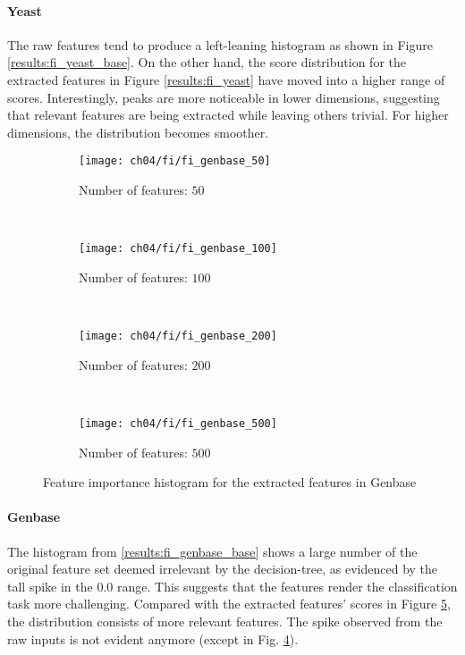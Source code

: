 \paragraph{Yeast} The raw features tend to produce a left-leaning histogram
as shown in Figure \ref{results:fi_yeast_base}.  On the other hand, the score
distribution for the extracted features in Figure \ref{results:fi_yeast} have
moved into a higher range of scores. Interestingly, peaks are more noticeable
in lower dimensions, suggesting that relevant features are being extracted
while leaving others trivial. For higher dimensions, the distribution becomes
smoother. 

\begin{figure}[t]
    \centering
    \begin{subfigure}[b]{0.45\textwidth}
        \texttt{[image: ch04/fi/fi\_genbase\_50]}
        \caption{Number of features: $50$}
        \label{results:fi_genbase_50}
    \end{subfigure}
    ~ %
    \begin{subfigure}[b]{0.45\textwidth}
        \texttt{[image: ch04/fi/fi\_genbase\_100]}
        \caption{Number of features: $100$}
        \label{results:fi_genbase_100}
    \end{subfigure}
    ~ %
    \begin{subfigure}[b]{0.45\textwidth}
        \texttt{[image: ch04/fi/fi\_genbase\_200]}
        \caption{Number of features: $200$}
        \label{results:fi_genbase_200}
    \end{subfigure}
    ~ %
    \begin{subfigure}[b]{0.45\textwidth}
        \texttt{[image: ch04/fi/fi\_genbase\_500]}
        \caption{Number of features: $500$}
        \label{results:fi_genbase_500}
    \end{subfigure}
    \caption{Feature importance histogram for the extracted features in Genbase}
    \label{results:fi_genbase}
\end{figure}


\paragraph{Genbase} The histogram from \ref{results:fi_genbase_base} shows a
large number of the original feature set deemed irrelevant by the
decision-tree, as evidenced by the tall spike in the $0.0$ range. This suggests
that the features render the classification task more challenging. Compared
with the extracted features' scores in Figure \ref{results:fi_genbase}, the
distribution consists of more relevant features. The spike observed from the
raw inputs is not evident anymore (except in Fig.
\ref{results:fi_genbase_500}).\\

